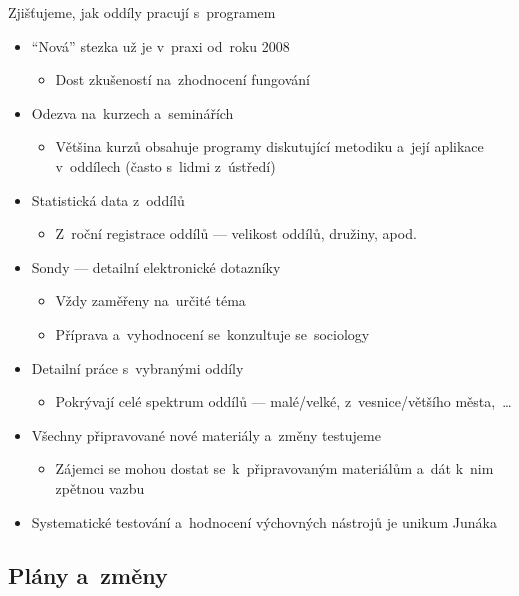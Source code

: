\documentclass[compress, xelatex, 11pt, xcolor=dvipsnames, print, aspectratio=169,
	hyperref={
		bookmarks=true,
		unicode=true,
		colorlinks=true,
		pdftitle={Skautska vychovna metoda},
		plainpages=false,
		pdfauthor={Vojtech Zeisek},
		pdfsubject={Skautska vychovna metoda a jeji vyvoj za posledni stoleti a desetileti},
		pdfcreator={XeLaTeX},
		pdfkeywords={Junak, Pedagogika, Skaut, Skauting, Vychovna metoda},
		linkcolor=Red, %
		anchorcolor=ForestGreen, %
		citecolor=ForestGreen, %
		filecolor=ForestGreen, %
		menucolor=ForestGreen, %
		urlcolor=Sepia, %
		pdftex},
	url={hyphens, lowtilde} %
	]{beamer}
\begin{document}
\begin{frame}{Zjišťujeme, jak oddíly pracují s~programem}
	\begin{itemize}
		\item \enquote{Nová} stezka už je v~praxi od~roku 2008
		\begin{itemize}
			\item Dost zkušeností na~zhodnocení fungování
		\end{itemize}
		\item Odezva na~kurzech a~seminářích
		\begin{itemize}
			\item Většina kurzů obsahuje programy diskutující metodiku a~její aplikace v~oddílech (často s~lidmi z~ústředí)
		\end{itemize}
		\item Statistická data z~oddílů
		\begin{itemize}
			\item Z~roční registrace oddílů --- velikost oddílů, družiny, apod.
		\end{itemize}
		\item Sondy --- detailní elektronické dotazníky
		\begin{itemize}
			\item Vždy zaměřeny na~určité téma
			\item Příprava a~vyhodnocení se~konzultuje se~sociology
		\end{itemize}
		\item Detailní práce s~vybranými oddíly
		\begin{itemize}
			\item Pokrývají celé spektrum oddílů --- malé/velké, z~vesnice/většího města,~\ldots
		\end{itemize}
		\item Všechny připravované nové materiály a~změny testujeme
		\begin{itemize}
			\item Zájemci se mohou dostat se~k~připravovaným materiálům a~dát k~nim zpětnou vazbu
		\end{itemize}
		\item \alert{Systematické testování a~hodnocení výchovných nástrojů je unikum Junáka}
	\end{itemize}
\end{frame}

\subsection{Plány a~změny}
\end{document}
